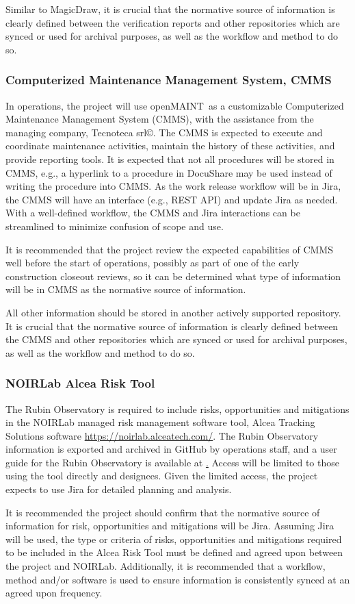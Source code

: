 Similar to MagicDraw, it is crucial that the normative source of information is clearly defined between the verification reports and other repositories which are synced or used for archival purposes, as well as the workflow and method to do so.

\subsubsection{Computerized Maintenance Management System, CMMS}

In operations, the project will use openMAINT\textregistered\ as a customizable Computerized Maintenance Management System (CMMS), with the assistance from the managing company, Tecnoteca srl\copyright . \citep{openmaint-cite}
The CMMS is expected to execute and coordinate maintenance activities, maintain the history of these activities, and provide reporting tools.
It is expected that not all procedures will be stored in CMMS, e.g., a hyperlink to a procedure in DocuShare may be used instead of writing the procedure into CMMS.
As the work release workflow will be in Jira, the CMMS will have an interface (e.g., REST API) and update Jira as needed.
With a well-defined workflow, the CMMS and Jira interactions can be streamlined to minimize confusion of scope and use.

It is recommended that the project review the expected capabilities of CMMS well before the start of operations, possibly as part of one of the early construction closeout reviews, so it can be determined what type of information will be in CMMS as the normative source of information.

All other information should be stored in another actively supported repository.
It is crucial that the normative source of information is clearly defined between the CMMS and other repositories which are synced or used for archival purposes, as well as the workflow and method to do so.

\subsubsection{NOIRLab Alcea Risk Tool}

The Rubin Observatory is required to include risks, opportunities and mitigations in the NOIRLab managed risk management software tool, Alcea Tracking Solutions software \url{https://noirlab.alceatech.com/}.
The Rubin Observatory information is exported and archived in GitHub by operations staff, and a user guide for the Rubin Observatory is available at \href{https://rtn-051.lsst.io/}.
Access will be limited to those using the tool directly and designees.
Given the limited access, the project expects to use Jira for detailed planning and analysis.

It is recommended the project should confirm that the normative source of information for risk, opportunities and mitigations will be Jira.
Assuming Jira will be used, the type or criteria of risks, opportunities and mitigations required to be included in the Alcea Risk Tool must be defined and agreed upon between the project and NOIRLab.
Additionally, it is recommended that a workflow, method and/or software is used to ensure information is consistently synced at an agreed upon frequency.

